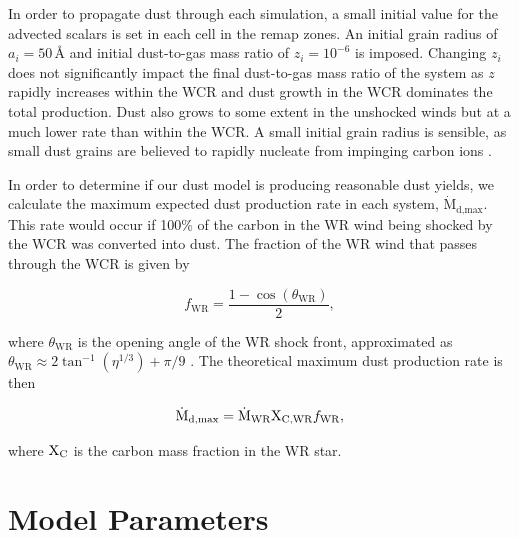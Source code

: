 \documentclass[fleqn,usenatbib]{mnras}
\newcommand{\maxdust}{\ensuremath{\dot{\text{M}}_\text{d,max}}}
\begin{document}
In order to propagate dust through each simulation, a small initial value for the advected scalars is set in each cell in the remap zones.
An initial grain radius of $a_i = 50 \, \text{\AA}$ and initial dust-to-gas mass ratio of $z_i = 10^{-6}$ is imposed.
Changing $z_i$ does not significantly impact the final dust-to-gas mass ratio of the system as $z$ rapidly increases within the WCR and dust growth in the WCR dominates the total production.
Dust also grows to some extent in the unshocked winds but at a much lower rate than within the WCR.
A small initial grain radius is sensible, as small dust grains are believed to rapidly nucleate from impinging carbon ions 
\citep{harriesThreedimensionalDustRadiativetransfer2004,zubkoPhysicalModelDust1998a}.

In order to determine if our dust model is producing reasonable dust yields, we calculate the maximum expected dust production rate in each system, $\dot{\text{M}}_\text{d,max}$.
This rate would occur if 100\% of the carbon in the WR wind being shocked by the WCR was converted into dust.
The fraction of the WR wind that passes through the WCR is given by

\begin{equation}
	f_\text{WR} = \frac{1 - \cos \left(\theta_\text{WR}\right)}{2} ,
\end{equation}

\noindent
where $\theta_\text{WR}$ is the opening angle of the WR shock front, approximated as $\theta_\text{WR} \approx 2 \tan^{-1} ( \eta^{1/3} ) + \pi/9$ \citep{pittardCollidingStellarWinds2018}.
The theoretical maximum dust production rate is then

\begin{equation}
  \label{eq:maxdust}
	\maxdust = \dot{\text{M}}_\text{WR} \text X_\text{C,WR} f_\text{WR},
\end{equation}

\noindent
where $\text X_\text{C}$ is the carbon mass fraction in the WR star.


\section{Model Parameters}
\label{sec:p1-model-parameters}
\end{document}
